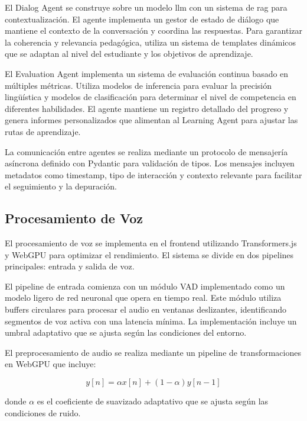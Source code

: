 El Dialog Agent se construye sobre un modelo \gls{llm} con un sistema de \gls{rag} para contextualización. El agente implementa un gestor de estado de diálogo que mantiene el contexto de la conversación y coordina las respuestas. Para garantizar la coherencia y relevancia pedagógica, utiliza un sistema de templates dinámicos que se adaptan al nivel del estudiante y los objetivos de aprendizaje.

El Evaluation Agent implementa un sistema de evaluación continua basado en múltiples métricas. Utiliza modelos de inferencia para evaluar la precisión lingüística y modelos de clasificación para determinar el nivel de competencia en diferentes habilidades. El agente mantiene un registro detallado del progreso y genera informes personalizados que alimentan al Learning Agent para ajustar las rutas de aprendizaje.

La comunicación entre agentes se realiza mediante un protocolo de mensajería asíncrona definido con Pydantic para validación de tipos. Los mensajes incluyen metadatos como timestamp, tipo de interacción y contexto relevante para facilitar el seguimiento y la depuración.

\subsection{Procesamiento de Voz}
\label{implementacion-voz}

El procesamiento de voz se implementa en el frontend utilizando Transformers.js y WebGPU para optimizar el rendimiento. El sistema se divide en dos pipelines principales: entrada y salida de voz.

El pipeline de entrada comienza con un módulo VAD implementado como un modelo ligero de red neuronal que opera en tiempo real. Este módulo utiliza buffers circulares para procesar el audio en ventanas deslizantes, identificando segmentos de voz activa con una latencia mínima. La implementación incluye un umbral adaptativo que se ajusta según las condiciones del entorno.

El preprocesamiento de audio se realiza mediante un pipeline de transformaciones en WebGPU que incluye:

\begin{equation}
    y[n] = \alpha x[n] + (1-\alpha)y[n-1]
\end{equation}

donde $\alpha$ es el coeficiente de suavizado adaptativo que se ajusta según las condiciones de ruido.

